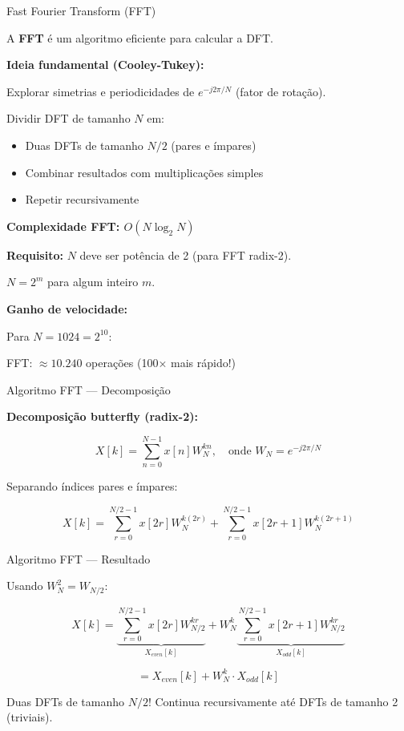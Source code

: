 
\begin{frame}{Fast Fourier Transform (FFT)}

A \textbf{FFT} é um algoritmo eficiente para calcular a DFT.

\textbf{Ideia fundamental (Cooley-Tukey):}

Explorar simetrias e periodicidades de $e^{-j2\pi/N}$ (fator de rotação).

Dividir DFT de tamanho $N$ em:
\begin{itemize}
\item Duas DFTs de tamanho $N/2$ (pares e ímpares)
\item Combinar resultados com multiplicações simples
\item Repetir recursivamente
\end{itemize}

\textbf{Complexidade FFT: $O(N\log_2 N)$}

\vspace{0.1cm}

\textbf{Requisito:} $N$ deve ser potência de 2 (para FFT radix-2).

$N = 2^m$ para algum inteiro $m$.

\vspace{0.1cm}

\textbf{Ganho de velocidade:}

Para $N = 1024 = 2^{10}$:

FFT: $\approx 10.240$ operações (100× mais rápido!)

\end{frame}


\begin{frame}{Algoritmo FFT --- Decomposição}

\textbf{Decomposição butterfly (radix-2):}

\[
X[k] = \sum_{n=0}^{N-1} x[n] W_N^{kn}, \quad \text{onde } W_N = e^{-j2\pi/N}
\]

Separando índices pares e ímpares:

\[
X[k] = \sum_{r=0}^{N/2-1} x[2r] W_N^{k(2r)} + \sum_{r=0}^{N/2-1} x[2r+1] W_N^{k(2r+1)}
\]

\end{frame}


\begin{frame}{Algoritmo FFT --- Resultado}

Usando $W_N^2 = W_{N/2}$:

\[
X[k] = \underbrace{\sum_{r=0}^{N/2-1} x[2r] W_{N/2}^{kr}}_{X_{even}[k]} + W_N^k \underbrace{\sum_{r=0}^{N/2-1} x[2r+1] W_{N/2}^{kr}}_{X_{odd}[k]}
\]

\[
= X_{even}[k] + W_N^k \cdot X_{odd}[k]
\]

Duas DFTs de tamanho $N/2$! Continua recursivamente até DFTs de tamanho 2 (triviais).

\end{frame}

